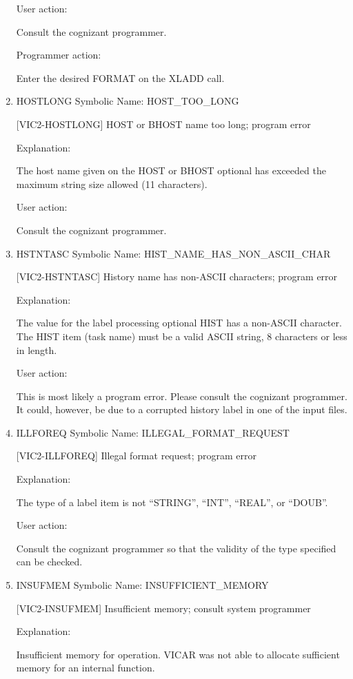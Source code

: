 \begin{enumerate}
User action:

Consult the cognizant programmer.

Programmer action:

Enter the desired FORMAT on the XLADD call.


\item HOSTLONG Symbolic Name: HOST\_TOO\_LONG

[VIC2-HOSTLONG] HOST or BHOST name too long; program error

Explanation:

The host name given on the HOST or BHOST optional has exceeded the
maximum string size allowed (11 characters).

User action:

Consult the cognizant programmer.


\item HSTNTASC Symbolic Name: HIST\_NAME\_HAS\_NON\_ASCII\_CHAR

[VIC2-HSTNTASC] History name has non-ASCII characters; program error

Explanation:

The value for the label processing optional HIST has a non-ASCII
character.  The HIST item (task name) must be a valid ASCII string,
8 characters or less in length.

User action:

This is most likely a program error.  Please consult the
cognizant programmer.  It could, however, be due to a corrupted
history label in one of the input files.


\item ILLFOREQ Symbolic Name: ILLEGAL\_FORMAT\_REQUEST

[VIC2-ILLFOREQ] Illegal format request; program error

Explanation:

The type of a label item is not ``STRING'', ``INT'', ``REAL'',
or ``DOUB''.

User action:

Consult the cognizant programmer so that the validity of
the type specified can be checked.


\item INSUFMEM Symbolic Name: INSUFFICIENT\_MEMORY

[VIC2-INSUFMEM] Insufficient memory; consult system programmer

Explanation:

Insufficient memory for operation.  VICAR was not able to allocate
sufficient memory for an internal function.


\end{enumerate}
